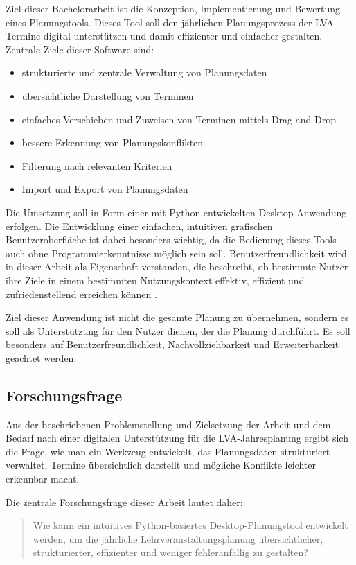 \documentclass[12pt,a4paper]{article}
\begin{document}
Ziel dieser Bachelorarbeit ist die Konzeption, Implementierung und Bewertung eines Planungstools. Dieses Tool soll den jährlichen Planungsprozess der LVA-Termine digital unterstützen und damit effizienter und einfacher gestalten.
Zentrale Ziele dieser Software sind:

\begin{itemize}
\item strukturierte und zentrale Verwaltung von Planungsdaten
\item übersichtliche Darstellung von Terminen
\item einfaches Verschieben und Zuweisen von Terminen mittels Drag-and-Drop
\item bessere Erkennung von Planungskonflikten
\item Filterung nach relevanten Kriterien
\item Import und Export von Planungsdaten
\end{itemize}

Die Umsetzung soll in Form einer mit Python entwickelten Desktop-Anwendung erfolgen. Die Entwicklung einer einfachen, intuitiven grafischen Benutzeroberfläche ist dabei besonders wichtig, da die Bedienung dieses Tools auch ohne Programmierkenntnisse möglich sein soll. Benutzerfreundlichkeit wird in dieser Arbeit als Eigenschaft verstanden, die beschreibt, ob bestimmte Nutzer ihre Ziele in einem bestimmten Nutzungskontext effektiv, effizient und zufriedenstellend erreichen können \cite{nistUsability}.

Ziel dieser Anwendung ist nicht die gesamte Planung zu übernehmen, sondern es soll als Unterstützung für den Nutzer dienen, der die Planung durchführt. Es soll besonders auf Benutzerfreundlichkeit, Nachvollziehbarkeit und Erweiterbarkeit geachtet werden.


\subsection{Forschungsfrage}

Aus der beschriebenen Problemstellung und Zielsetzung der Arbeit und dem Bedarf nach einer digitalen Unterstützung für die LVA-Jahresplanung ergibt sich die Frage, wie man ein Werkzeug entwickelt, das Planungsdaten strukturiert verwaltet, Termine übersichtlich darstellt und mögliche Konflikte leichter erkennbar macht.

Die zentrale Forschungsfrage dieser Arbeit lautet daher:

\begin{quote}
Wie kann ein intuitives Python-basiertes Desktop-Planungstool entwickelt werden, um die jährliche Lehrveranstaltungsplanung übersichtlicher, strukturierter, effizienter und weniger fehleranfällig zu gestalten?
\end{quote}
\end{document}
